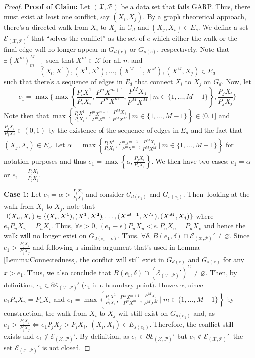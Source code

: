 \documentclass{article} %
\theoremstyle{style1}
\theoremstyle{example}
\begin{document}
\begin{proof}
\textbf{Proof of Claim:} Let $(\mathcal{X},\mathcal{P})$ be a data set that fails GARP. Thus, there must exist at least one conflict, say $(X_i,X_j)$. By a graph theoretical approach, there's a directed walk from $X_i$ to $X_j$ in $G_d$ and $(X_j,X_i)\in E_s$. We define a set $\mathcal{E}_{(\mathcal{X},\mathcal{P})}'$ that ``solves the conflict'' as the set of $e$ which either the walk or the final edge will no longer appear in $G_{d(e)}$ or $G_{s(e)}$, respectively. Note that $\exists (X^m)_{m=1}^M$ such that $X^m\in\mathcal{X}$ for all $m$ and 
$$(X_i,X^1),(X^1,X^2),\ldots, (X^{M-1},X^M), (X^M, X_j)\in E_d$$ 
such that there's a sequence of edges in $E_d$ that connect $X_i$ to $X_j$ on $G_d$. Now, let 
$$e_1=\max\Bigg\{\max\left\{\frac{P_iX^1}{P_iX_i},\frac{P^mX^{m+1}}{P^mX^m},\frac{P^MX_j}{P^MX^M}\ |\ m\in\{1,\ldots, M-1\}\right\}, \frac{P_jX_i}{P_jX_j}\Bigg\}$$
Note then that $\max\left\{\frac{P_iX^1}{P_iX_i},\frac{P^mX^{m+1}}{P^mX^m},\frac{P^MX_j}{P^MX^M}\ |\ m\in\{1,\ldots, M-1\}\right\}\in(0,1]$ and $\frac{P_jX_i}{P_jX_j}\in(0,1)$ by the existence of the sequence of edges in $E_d$ and the fact that $(X_j,X_i)\in E_s$. Let $\alpha=\max\left\{\frac{P_iX^1}{P_iX_i},\frac{P^mX^{m+1}}{P^mX^m},\frac{P^MX_j}{P^MX^M}\ |\ m\in\{1,\ldots, M-1\}\right\}$ for notation purposes and thus $e_1=\max\left\{\alpha, \frac{P_jX_i}{P_jX_j}\right\}$. We then have two cases: $e_1=\alpha$ or $e_1=\frac{P_jX_i}{P_jX_j}$.

\textbf{Case 1:} Let $e_1=\alpha>\frac{P_jX_i}{P_jX_j}$ and consider $G_{d(e_1)}$ and $G_{s(e_1)}$. Then, looking at the walk from $X_i$ to $X_j$, note that $\exists (X_u, X_v)\in \{(X_i,X^1),(X^1,X^2),\ldots, (X^{M-1},X^M),\\ (X^M, X_j)\}$ where $e_1 P_uX_u = P_uX_v$. Thus, $\forall \epsilon>0$, $(e_1-\epsilon)P_uX_u< e_1 P_uX_u = P_uX_v$ and hence the walk will no longer exist on $G_{d(e_1-\epsilon)}$. Thus, $\forall \delta$, $B(e_1,\delta)\cap \mathcal{E}_{(\mathcal{X},\mathcal{P})}'\not=\varnothing$. Since $e_1>\frac{P_jX_i}{P_jX_j}$ and following a similar argument that's used in Lemma \ref{Lemma:Connectedness}, the conflict will still exist in $G_{d(x)}$ and $G_{s(x)}$ for any $x>e_1$. Thus, we also conclude that $B(e_1,\delta)\cap (\mathcal{E}_{(\mathcal{X},\mathcal{P})}')^C\not=\varnothing$. Then, by definition, $e_1\in\partial \mathcal{E}_{(\mathcal{X},\mathcal{P})}'$ ($e_1$ is a boundary point). However, since $e_1 P_uX_u = P_uX_v$ and $e_1 = \max\left\{\frac{P_iX^1}{P_iX_i},\frac{P^mX^{m+1}}{P^mX^m},\frac{P^MX_j}{P^MX^M}\ |\ m\in\{1,\ldots, M-1\}\right\}$ by construction, the walk from $X_i$ to $X_j$ will still exist on $G_{d(e_1)}$ and, as $e_1>\frac{P_jX_i}{P_jX_j} \iff e_1 P_jX_j > P_jX_i$, $(X_j,X_i)\in E_{s(e_1)}$. Therefore, the conflict still exists and $e_1\not\in \mathcal{E}_{(\mathcal{X},\mathcal{P})}'$. By definition, as $e_1\in\partial \mathcal{E}_{(\mathcal{X},\mathcal{P})}'$ but $e_1\not\in \mathcal{E}_{(\mathcal{X},\mathcal{P})}'$, the set $\mathcal{E}_{(\mathcal{X},\mathcal{P})}'$ is not closed.


\end{proof}
\end{document}
